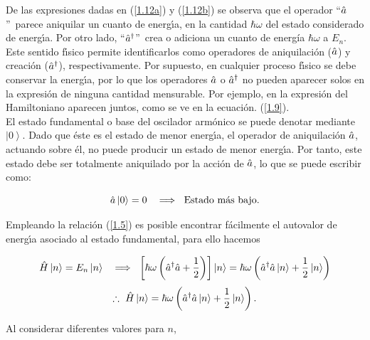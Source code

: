 De las expresiones dadas en (\ref{1.12a}) y (\ref{1.12b}) se observa que el operador \textquotedblleft $\hat{a}$\textquotedblright\ parece aniquilar un cuanto de energ\'{\i}a, en la cantidad $\hbar \omega $ del estado considerado de energ\'{\i}a. Por otro lado, \textquotedblleft $\hat{a}^{\dagger}$\textquotedblright\ crea o adiciona un cuanto de energía $\hbar \omega$ a $E_{n}$. Este sentido f\'{\i}sico permite identificarlos como operadores de aniquilaci\'{o}n ($\hat{a}$) y creaci\'{o}n ($\hat{a}^{\dagger}$), respectivamente. Por supuesto, en cualquier proceso f\'{\i}sico se debe conservar la energ\'{\i}a, por lo que los operadores $\hat{a}$ o $\hat{a}^{\dagger}$ no pueden aparecer solos en la expresi\'{o}n de ninguna cantidad mensurable. Por ejemplo, en la expresi\'{o}n del Hamiltoniano aparecen juntos, como se ve en la ecuaci\'{o}n. (\ref{1.9}).\\

\noindent
El estado fundamental o base del oscilador arm\'{o}nico se puede denotar mediante $\left\vert 0\right\rangle $. Dado que \'{e}ste es el estado de menor energ\'{\i}a, el operador de aniquilaci\'{o}n $\hat{a}$, actuando sobre \'{e}l, no puede producir un estado de menor energ\'{\i}a. Por tanto, este estado debe ser totalmente aniquilado por la acci\'{o}n de $\hat{a}$, lo que se puede escribir como:

\begin{equation}
	\Oaa \left\vert 0\right\rangle =0~\ \implies ~\text{Estado m\'{a}s bajo.}
	\label{1.13}
\end{equation}

Empleando la relaci\'{o}n (\ref{1.5}) es posible encontrar f\'{a}cilmente el autovalor de energ\'{\i}a asociado al estado fundamental, para ello hacemos

\begin{equation*}
\hat{H} \left\vert n\right\rangle =E_{n}\left\vert n\right\rangle ~\ \implies ~ 
\left[ \hbar \omega \left( \hat{a}^{\dagger } \hat{a} +\frac{1}{2}\right) \right]
\left\vert n\right\rangle =\hbar \omega \left( \hat{a}^{\dagger } \hat{a} \left\vert
n\right\rangle +\frac{1}{2}\left\vert n\right\rangle \right)
\end{equation*}
\begin{equation*}
\therefore ~\hat{H}\left\vert n\right\rangle =\hbar \omega \left( \hat{a}^{\dagger
} \hat{a} \left\vert n\right\rangle +\frac{1}{2}\left\vert n\right\rangle \right).
\end{equation*}

Al considerar diferentes valores para $n$,


